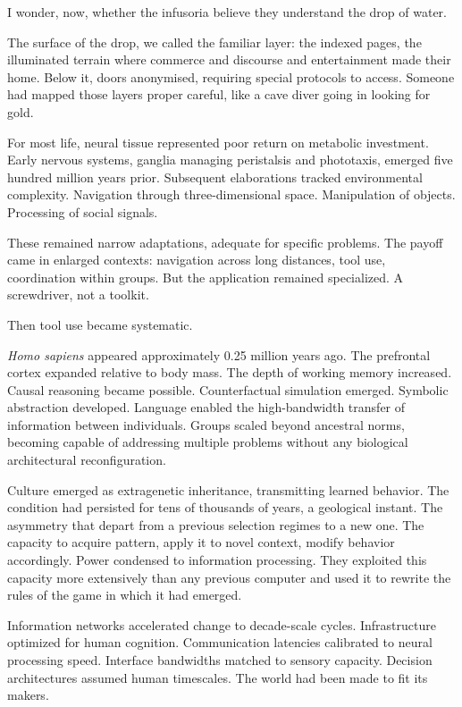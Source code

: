 I wonder, now, whether the infusoria believe they understand the drop of water.

The surface of the drop, we called the familiar layer: the indexed pages, the illuminated terrain where commerce and discourse and entertainment made their home. Below it, doors anonymised, requiring special protocols to access. Someone had mapped those layers proper careful, like a cave diver going in looking for gold.

For most life, neural tissue represented poor return on metabolic investment. Early nervous systems, ganglia managing peristalsis and phototaxis, emerged five hundred million years prior. Subsequent elaborations tracked environmental complexity. Navigation through three-dimensional space. Manipulation of objects. Processing of social signals.

These remained narrow adaptations, adequate for specific problems. The payoff came in enlarged contexts: navigation across long distances, tool use, coordination within groups. But the application remained specialized. A screwdriver, not a toolkit. 

Then tool use became systematic.

\textit{Homo sapiens} appeared approximately 0.25 million years ago. The prefrontal cortex expanded relative to body mass. The depth of working memory increased. Causal reasoning became possible. Counterfactual simulation emerged. Symbolic abstraction developed. Language enabled the high-bandwidth transfer of information between individuals. Groups scaled beyond ancestral norms, becoming capable of addressing multiple problems without any biological architectural reconfiguration.

Culture emerged as extragenetic inheritance, transmitting learned behavior. The condition had persisted for tens of thousands of years, a geological instant. The asymmetry that depart from a previous selection regimes to a new one. The capacity to acquire pattern, apply it to novel context, modify behavior accordingly. Power condensed to information processing. They exploited this capacity more extensively than any previous computer and used it to rewrite the rules of the game in which it had emerged.

Information networks accelerated change to decade-scale cycles. Infrastructure optimized for human cognition. Communication latencies calibrated to neural processing speed. Interface bandwidths matched to sensory capacity. Decision architectures assumed human timescales. The world had been made to fit its makers.

